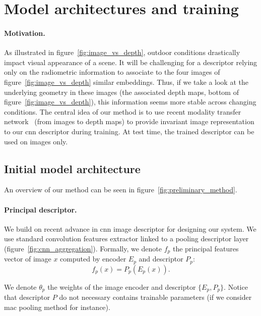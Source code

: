 \section{Model architectures and training}
\label{sec:preliminary_work}

\paragraph{Motivation.}

As illustrated in figure~\ref{fig:image_vs_depth}, outdoor conditions drastically impact visual appearance of a scene. It will be challenging for a descriptor relying only on the radiometric information to associate to the four images of figure~\ref{fig:image_vs_depth} similar embeddings. Thus, if we take a look at the underlying geometry in these images (\ie the associated depth maps, bottom of figure~\ref{fig:image_vs_depth}), this information seems more stable across changing conditions. The central idea of our method is to use recent modality transfer network~\citep{Eigen2014, Godard2017, Mahjourian2018} (from images to depth maps) to provide invariant image representation to our \ac{cnn} descriptor during training. At test time, the trained descriptor can be used on images only.

\subsection{Initial model architecture}

An overview of our method can be seen in figure~\ref{fig:preliminary_method}.

\paragraph{Principal descriptor.}
We build on recent advance in \ac{cnn} image descriptor for designing our system. We use standard convolution features extractor linked to a pooling descriptor layer (figure~\ref{fig:cnn_aggregation}). Formally, we denote $f_p$ the principal features vector of image $x$ computed by encoder $E_p$ and descriptor $P_p$:
\begin{equation}
	\label{eq:desc_details}
	f_p(x) = P_p(E_p(x)).
\end{equation}

We denote $\theta_{p}$ the weights of the image encoder and descriptor $\{E_p, P_p\}$. Notice that descriptor $P$ do not necessary contains trainable parameters (if we consider \ac{mac} pooling method for instance).

